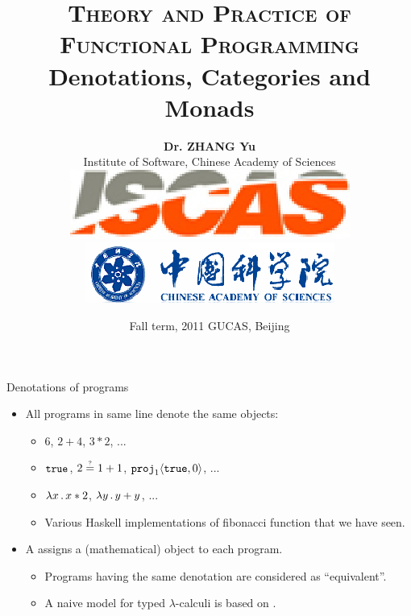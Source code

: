 \documentclass[paper=screen,mode=present,style=zysimple]{powerdot}
\title{{\small \textsc{Theory and Practice of Functional Programming}}
\\[12pt]
{\Large \color{TitleColor} Denotations, Categories and Monads}
}
\author{\small \textbf{Dr. ZHANG Yu}
  \\[2pt] \small Institute of Software, Chinese Academy of Sciences 
  \\[5pt] \includegraphics[height=.04\slideheight]{iscas.eps} 
  \qquad \qquad 
  \includegraphics[height=.04\slideheight]{cas.eps}
}
\date{\scriptsize Fall term, 2011 \qquad GUCAS, Beijing}
\begin{document}
\maketitle 

\begin{slide}{Denotations of programs}
\begin{itemize}
\item All programs in same line denote the same objects:
\begin{itemize}\small
\item $6$, $2 + 4$, $3 * 2$, ...
\item $\mathtt{true}$, $2 \stackrel{\mbox{\tiny ?}}{=} 1 + 1$, $\mathtt{proj}_1 \langle{\mathtt{true}, 0}\rangle$, ...
\item $\lambda x \, . \, x * 2$, $\lambda y \, . \, y + y$, ...
\item Various Haskell implementations of fibonacci function that we have seen.
\end{itemize}
\item A  assigns a (mathematical) object to each program. 
\begin{itemize}
\item Programs having the same denotation are considered as ``equivalent''.
\item A naive model for typed $\lambda$-calculi is based on .
\end{itemize}
\end{itemize}
\end{slide}
\end{document}
